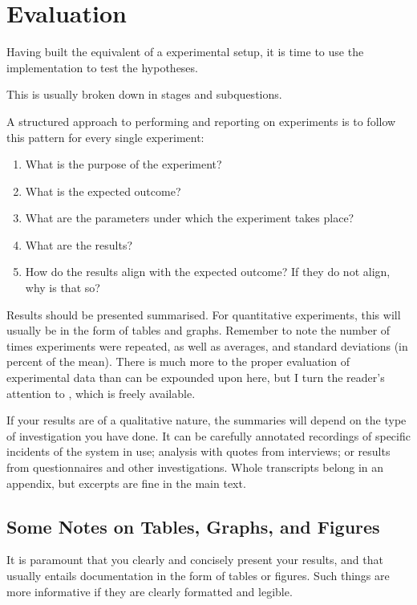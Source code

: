 \chapter{Evaluation}
\label{cha:evaluation}

Having built the equivalent of a experimental setup, it is time to use
the implementation to test the hypotheses.

This is usually broken down in stages and subquestions.

A structured approach to performing and reporting on experiments is
to follow this pattern for every single experiment:

\begin{enumerate}
\item What is the purpose of the experiment?
\item What is the expected outcome?
\item What are the parameters under which the experiment takes place?
\item What are the results?
\item How do the results align with the expected outcome? If they do not
  align, why is that so?
\end{enumerate}

Results should be presented summarised. For quantitative experiments, this
will usually be in the form of tables and graphs.  Remember to note the
number of times experiments were repeated, as well as averages, and standard
deviations (in percent of the mean).  There is much more to the proper
evaluation of experimental data than can be expounded upon here, but I turn
the reader's attention to \citep{Downey2011:TSPASFP2011}, which is freely
available.

If your results are of a qualitative nature, the summaries will depend on
the type of investigation you have done. It can be carefully annotated
recordings of specific incidents of the system in use; analysis with quotes
from interviews; or results from questionnaires and other investigations.
Whole transcripts belong in an appendix, but excerpts are fine in the main
text.

\section{Some Notes on Tables, Graphs, and Figures}
\label{sec:some-notes-tables}

It is paramount that you clearly and concisely present your results, and
that usually entails documentation in the form of tables or figures.  Such
things are more informative if they are clearly formatted and legible.

